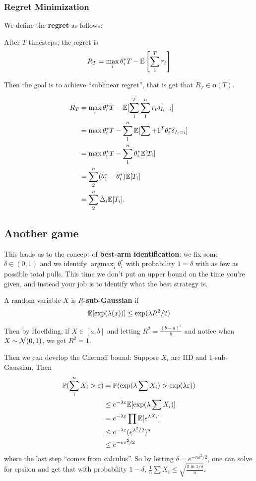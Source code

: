 \documentclass[12pt]{article}
\DeclareMathOperator{\argmax}{argmax}
\begin{document}
\subsubsection{Regret Minimization}
We define the \textbf{regret} as follows:
\begin{defn}
	After $T$ timesteps, the regret is 
	\[R_T=\max_i\theta_i^\ast T-\mathbb{E}\left[\sum_1^T r_t\right]\]
\end{defn}
Then the goal is to achieve ``sublinear regret'', that is get that $R_T\in\mathbf{o}(T)$.
\begin{lem}
	\begin{align*}
		R_T&=\max_i\theta_i^\ast T-\mathbb{E}[\sum_1^T\sum_1^n r_t\delta_{I_t=i}]\\
		&=\max\theta_i^\ast T - \sum_1^n\mathbb{E}[\sum+1^T\theta_i^\ast\delta_{I_t=i}]\\
		&=\max\theta_i^\ast T-\sum_1^n\theta_i^\ast\mathbb{E}[T_i]\\
		&=\sum_2^n(\theta_1^\ast-\theta_i^\ast)\mathbb{E}[T_i]\\
		&=\sum_2^n\Delta_i\mathbb{E}[T_i].
	\end{align*}
\end{lem}

\subsection{Another game}
This leads us to the concept of \textbf{best-arm identification}: we fix some $\delta\in(0,1)$ and we identify $\argmax_i\theta_i^\ast$ with probability $1=\delta$ with as few as possible total pulls.
This time we don't put an upper bound on the time you're given, and instead your job is to identify what the best strategy is.

\begin{defn}
	A random variable $X$ is \textbf{$R$-sub-Gaussian} if 
	\[\mathbb{E}[\exp(\lambda(x))]\le\exp(\lambda R^2/2)\]
\end{defn}
\begin{rmk}
	Then by Hoeffding, if $X\in[a,b]$  and letting $R^2=\frac{(b-a)^2}{8}$ and notice when $X\sim \mathcal{N}(0,1)$, we get $R^2=1$.
\end{rmk}

Then we can develop the Chernoff bound: Suppose $X_i$ are IID and $1$-sub-Gaussian. Then 
\begin{align*}
	\mathbb{P}(\sum_1^n X_i >\varepsilon)&=\mathbb{P}(\exp(\lambda\sum X_i) >\exp(\lambda\varepsilon))\\
	&\le e^{-\lambda\varepsilon}\mathbb{E}[\exp(\lambda\sum X_i)]\\
	&= e^{-\lambda\varepsilon}\prod\mathbb{E}[e^{\lambda X_i}]\\
	&\le e^{-\lambda\varepsilon}(e^{\lambda^2/2})^n\\
	&\le e^{-n\varepsilon^2/2}
\end{align*}
where the last step ``comes from calculus''. So by letting $\delta=e^{-n\varepsilon^2/2}$, one can solve for epsilon
and get that with probability $1-\delta$, $\frac{1}{n}\sum X_i\le\sqrt{\frac{2\ln 1/\delta}{n}}$.
\end{document}
